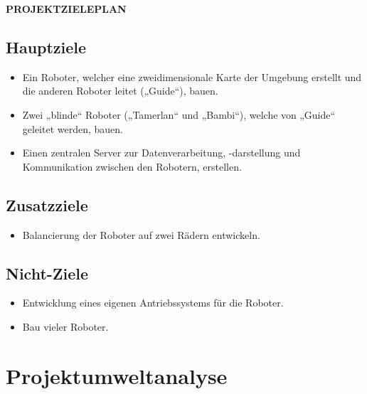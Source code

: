 \textbf{PROJEKTZIELEPLAN} \\

\subsection{Hauptziele}
\begin{itemize}
    \item Ein Roboter, welcher eine zweidimensionale Karte der Umgebung erstellt und die anderen Roboter leitet („Guide“), bauen.
    \item Zwei „blinde“ Roboter („Tamerlan“ und „Bambi“), welche von „Guide“ geleitet werden, bauen.
    \item Einen zentralen Server zur Datenverarbeitung, -darstellung und Kommunikation zwischen den Robotern, erstellen.
\end{itemize}

\subsection{Zusatzziele}
\begin{itemize}
    \item Balancierung der Roboter auf zwei Rädern entwickeln.
\end{itemize}

\subsection{Nicht-Ziele}
\begin{itemize}
    \item Entwicklung eines eigenen Antriebssystems für die Roboter.
    \item Bau vieler Roboter.
\end{itemize}

\newpage

\section{Projektumweltanalyse}


